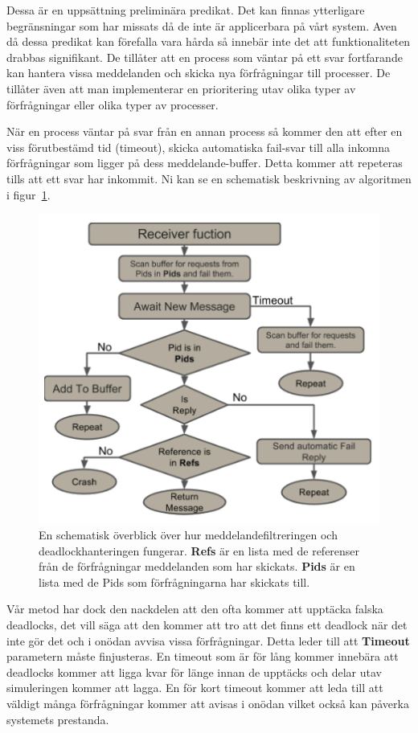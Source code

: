 \documentclass[12pt]{article}
\begin{document}
Dessa är en uppsättning preliminära predikat.
Det kan finnas ytterligare begränsningar som har missats då de inte är applicerbara på vårt system.
Aven då dessa predikat
kan förefalla vara hårda så innebär inte det att funktionaliteten drabbas signifikant.
De tillåter att en process som väntar på ett svar fortfarande kan hantera vissa meddelanden och skicka nya förfrågningar till processer.
De tillåter även att man implementerar en prioritering utav olika typer av förfrågningar eller olika typer av processer.

När en process väntar på svar från en annan process så kommer den att efter en viss förutbestämd tid (timeout),
skicka automatiska fail-svar till alla inkomna förfrågningar som ligger på dess meddelande-buffer.
Detta kommer att repeteras tills att ett svar har inkommit.
Ni kan se en schematisk beskrivning av algoritmen i figur~\ref{fig:deadlock}.

\begin{figure}
    \centering
    \includegraphics[width=\textwidth]{BugsLife-Fig4.png}
    \caption{En schematisk överblick över hur meddelandefiltreringen och deadlockhanteringen fungerar.
    \textbf{Refs} är en lista med de referenser från de förfrågningar meddelanden som har skickats.
    \textbf{Pids} är en lista med de Pids som förfrågningarna har skickats till.}
    \label{fig:deadlock}
\end{figure}

Vår metod har dock den nackdelen att den ofta kommer att upptäcka falska deadlocks,
det vill säga att den kommer att tro att det finns ett deadlock när det inte gör det och i onödan avvisa vissa förfrågningar.
Detta leder till att \textbf{Timeout} parametern måste finjusteras.
En timeout som är för lång kommer innebära att deadlocks kommer att ligga kvar för länge innan de upptäcks och delar utav simuleringen kommer att lagga.
En för kort timeout kommer att leda till att väldigt många förfrågningar kommer att avisas i onödan vilket också kan påverka systemets prestanda.
\end{document}
